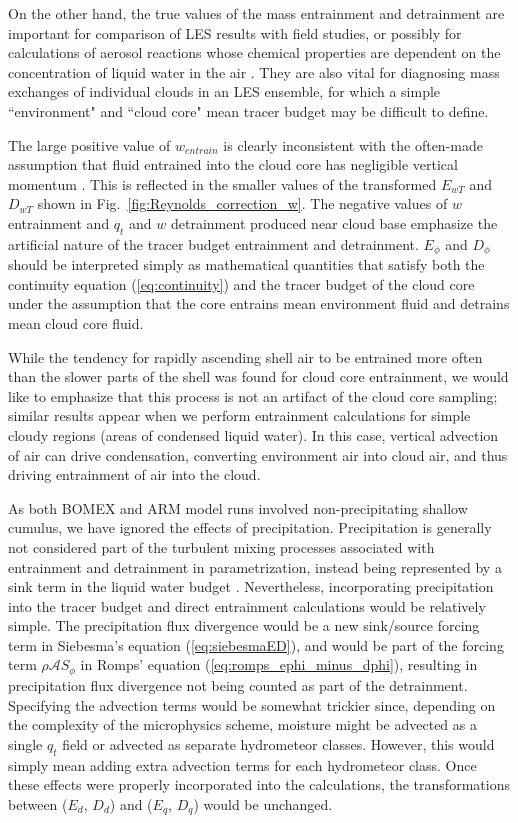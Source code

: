 \documentclass[12pt]{article}
\begin{document}
On the other hand, the true values of the mass entrainment and 
detrainment are important for comparison of LES results with field 
studies, or possibly for calculations of aerosol reactions whose chemical 
properties are dependent on the concentration of liquid water in the air 
\citep{Hoppel1994}.  They are also vital for diagnosing mass exchanges 
of individual clouds in an LES ensemble, for which a simple ``environment" 
and ``cloud core" mean tracer budget may be difficult to define.

The large positive value of $w_{entrain}$ is clearly inconsistent with 
the often-made assumption that fluid entrained into the cloud core has 
negligible vertical momentum \citep{Simpson1969,Gregory2001,Siebesma2003}.  
This is reflected in the smaller values of the transformed $E_{wT}$ and 
$D_{wT}$ shown in Fig.~\ref{fig:Reynolds_correction_w}.  The negative 
values of $w$ entrainment and $q_t$ and $w$ detrainment produced near 
cloud base emphasize the artificial nature of the tracer budget 
entrainment and detrainment.  $E_{\phi}$ and $D_{\phi}$ should be 
interpreted simply as mathematical quantities that satisfy both the 
continuity equation (\ref{eq:continuity}) and the tracer budget of the 
cloud core under the assumption that the core entrains mean environment 
fluid and detrains mean cloud core fluid.

While the tendency for rapidly ascending shell air to be entrained more 
often than the slower parts of the shell was found for cloud core 
entrainment, we would like to emphasize that this process is not an 
artifact of the cloud core sampling; similar results appear when we 
perform entrainment calculations for simple cloudy regions (areas of 
condensed liquid water).  In this case, vertical advection of air can 
drive condensation, converting environment air into cloud air, and thus 
driving entrainment of air into the cloud.

As both BOMEX and ARM model runs involved non-precipitating shallow 
cumulus, we have ignored the effects of precipitation.  Precipitation is 
generally not considered part of the turbulent mixing processes 
associated with entrainment and detrainment in parametrization, instead 
being represented by a sink term in the liquid water budget 
\citep{Tiedtke1989, Kain1990}.  Nevertheless, incorporating 
precipitation into the tracer budget and direct entrainment calculations 
would be relatively simple.  The precipitation flux divergence
would be a new sink/source forcing term in Siebesma's equation 
(\ref{eq:siebesmaED}), and would be part of the forcing term 
$\rho \mathcal{A}S_\phi$ in Romps' equation 
(\ref{eq:romps_ephi_minus_dphi}), resulting in precipitation flux 
divergence not being counted as part of the detrainment.  Specifying the 
advection terms would be somewhat trickier since, depending on the 
complexity of the microphysics scheme, moisture might be advected as a 
single $q_t$ field or advected as separate hydrometeor classes.  However, 
this would simply mean adding extra advection terms for each hydrometeor 
class.  Once these effects were properly incorporated into the 
calculations, the transformations between ($E_d$, $D_d$) and 
($E_q$, $D_q$) would be unchanged.
\end{document}
